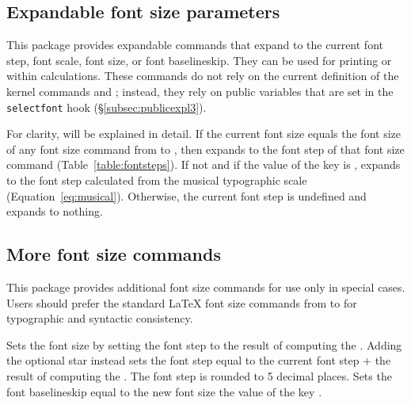\documentclass{beery}
\begin{document}
\subsection{Expandable font size parameters}
\label{subsec:expandable}

\begin{mydisplaycode}
  \nopagebreak\newline
  \newline
  \nopagebreak\newline
\end{mydisplaycode}

This package provides expandable commands that expand to the current font step, font scale, font size, or font baselineskip.
They can be used for printing or within calculations.
These commands do not rely on the current definition of the kernel commands  and ; instead, they rely on public  variables that are set in the \texttt{selectfont} hook (\S\ref{subsec:publicexpl3}).

For clarity,  will be explained in detail.
If the current font size equals the font size of any font size command from  to , then  expands to the font step of that font size command (Table~\ref{table:fontsteps}).
If not and if the value of the key  is ,  expands to the font step calculated from the musical typographic scale (Equation~\ref{eq:musical}).
Otherwise, the current font step is undefined and  expands to nothing.

\subsection{More font size commands}
\label{subsec:fontsize}

This package provides additional font size commands for use only in special cases.
Users should prefer the standard \LaTeX{} font size commands from  to  for typographic and syntactic consistency.

\begin{mydisplaycode}
   \sarg{} 
\end{mydisplaycode}

Sets the font size by setting the font step to the result of computing the .
Adding the optional star instead sets the font step equal to the current font step + the result of computing the .
The font step is rounded to \num{5} decimal places.
Sets the font baselineskip equal to the new font size \texttimes{} the value of the key .
\end{document}
